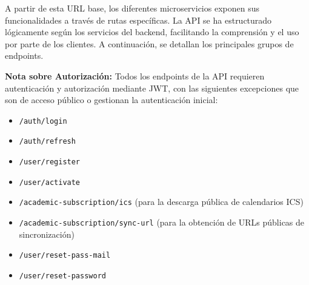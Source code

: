 A partir de esta URL base, los diferentes microservicios exponen sus funcionalidades a través de rutas específicas. La API se ha estructurado lógicamente según los servicios del backend, facilitando la comprensión y el uso por parte de los clientes. A continuación, se detallan los principales grupos de endpoints.

\noindent\textbf{Nota sobre Autorización:} Todos los endpoints de la API requieren autenticación y autorización mediante JWT, con las siguientes excepciones que son de acceso público o gestionan la autenticación inicial:
\begin{itemize}
    \item \texttt{/auth/login}
    \item \texttt{/auth/refresh}
    \item \texttt{/user/register}
    \item \texttt{/user/activate}
    \item \texttt{/academic-subscription/ics} (para la descarga pública de calendarios ICS)
    \item \texttt{/academic-subscription/sync-url} (para la obtención de URLs públicas de sincronización)
    \item \texttt{/user/reset-pass-mail}
    \item \texttt{/user/reset-password} 
\end{itemize}

